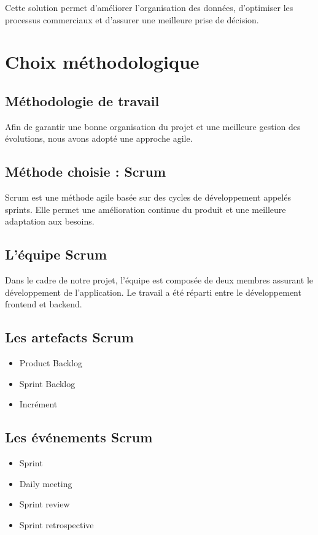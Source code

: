 \documentclass[12pt,a4paper]{report}
\begin{document}
Cette solution permet d’améliorer l’organisation des données, d’optimiser les processus commerciaux et d’assurer une meilleure prise de décision.

\section{Choix méthodologique}

\subsection{Méthodologie de travail}

Afin de garantir une bonne organisation du projet et une meilleure gestion des évolutions, nous avons adopté une approche agile.

\subsection{Méthode choisie : Scrum}

Scrum est une méthode agile basée sur des cycles de développement appelés sprints. Elle permet une amélioration continue du produit et une meilleure adaptation aux besoins.

\subsection{L’équipe Scrum}

Dans le cadre de notre projet, l’équipe est composée de deux membres assurant le développement de l’application. Le travail a été réparti entre le développement frontend et backend.

\subsection{Les artefacts Scrum}

\begin{itemize}
\item Product Backlog
\item Sprint Backlog
\item Incrément
\end{itemize}

\subsection{Les événements Scrum}

\begin{itemize}
\item Sprint
\item Daily meeting
\item Sprint review
\item Sprint retrospective
\end{itemize}
\end{document}
